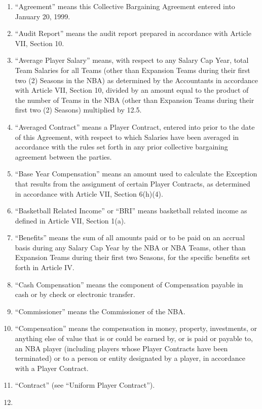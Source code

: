 \documentclass[
]{book}
\providecommand{\tightlist}{%
  \setlength{\itemsep}{0pt}\setlength{\parskip}{0pt}}
\begin{document}
\begin{enumerate}
\def\labelenumi{\arabic{enumi}.}
\tightlist
\item
  ``Agreement'' means this Collective Bargaining Agreement entered into January 20, 1999.
\item
  ``Audit Report'' means the audit report prepared in accordance with Article VII, Section 10.
\item
  ``Average Player Salary'' means, with respect to any Salary Cap Year, total Team Salaries for all Teams (other than Expansion Teams during their first two (2) Seasons in the NBA) as determined by the Accountants in accordance with Article VII, Section 10, divided by an amount equal to the product of the number of Teams in the NBA (other than Expansion Teams during their first two (2) Seasons) multiplied by 12.5.
\item
  ``Averaged Contract'' means a Player Contract, entered into prior to the date of this Agreement, with respect to which Salaries have been averaged in accordance with the rules set forth in any prior collective bargaining agreement between the parties.
\item
  ``Base Year Compensation'' means an amount used to calculate the Exception that results from the assignment of certain Player Contracts, as determined in accordance with Article VII, Section 6(h)(4).
\item
  ``Basketball Related Income'' or ``BRI'' means basketball related income as defined in Article VII, Section 1(a).
\item
  ``Benefits'' means the sum of all amounts paid or to be paid on an accrual basis during any Salary Cap Year by the NBA or NBA Teams, other than Expansion Teams during their first two Seasons, for the specific benefits set forth in Article IV.
\item
  ``Cash Compensation'' means the component of Compensation payable in cash or by check or electronic transfer.
\item
  ``Commissioner'' means the Commissioner of the NBA.
\item
  ``Compensation'' means the compensation in money, property, investments, or anything else of value that is or could be earned by, or is paid or payable to, an NBA player (including players whose Player Contracts have been terminated) or to a person or entity designated by a player, in accordance with a Player Contract.
\item
  ``Contract'' (see ``Uniform Player Contract'').
\item

\end{enumerate}
\end{document}
